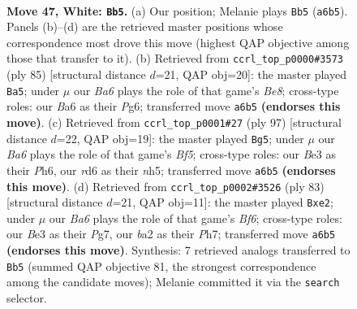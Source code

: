 \documentclass[11pt]{article}
\begin{document}
\clearpage

\begin{figure}[p]\centering
\begin{subfigure}{0.46\textwidth}\centering
\resizebox{\linewidth}{!}{%
\newchessgame
\chessboard[
  setfen={7k/4R3/B2r4/8/4p2p/4Bp1P/b4P2/6K1 w - - 4 47},
  showmover=false,
  pgfstyle=straightmove, color=movearrow, markmove={a6-b5}
]}
\caption{}
\end{subfigure}\hfill
\begin{subfigure}{0.46\textwidth}\centering
\resizebox{\linewidth}{!}{%
\newchessgame
\chessboard[
  setfen={7k/7p/4R1p1/6p1/P1K5/5B1P/1r4P1/4b3 b - - 3 43},
  showmover=false,
  pgfstyle=straightmove, color=movearrow, markmove={e1-a5}
]}
\caption{}
\end{subfigure}
\\[4pt]
\begin{subfigure}{0.46\textwidth}\centering
\resizebox{\linewidth}{!}{%
\newchessgame
\chessboard[
  setfen={6k1/5p2/7p/7N/Pp3b2/1P1r4/5PK1/4R3 b - - 2 49},
  showmover=false,
  pgfstyle=straightmove, color=movearrow, markmove={f4-g5}
]}
\caption{}
\end{subfigure}\hfill
\begin{subfigure}{0.46\textwidth}\centering
\resizebox{\linewidth}{!}{%
\newchessgame
\chessboard[
  setfen={8/4kppp/8/KP4P1/2r4P/3R1b2/4N3/8 b - - 26 42},
  showmover=false,
  pgfstyle=straightmove, color=movearrow, markmove={f3-e2}
]}
\caption{}
\end{subfigure}
\caption{\textbf{Move 47, White: \texttt{Bb5}.} (a) Our position; Melanie plays \texttt{Bb5} (\texttt{a6b5}). Panels (b)--(d) are the retrieved master positions whose correspondence most drove this move (highest QAP objective among those that transfer to it). (b) Retrieved from \texttt{ccrl\_top\_p0000\#3573} (ply 85) [structural distance $d$=21, QAP obj=20]: the master played \texttt{Ba5}; under $\mu$ our \emph{Ba6} plays the role of that game's \emph{Be8}; cross-type roles: our \emph{B}a6 as their \emph{P}g6; transferred move \texttt{a6b5} \textbf{(endorses this move)}. (c) Retrieved from \texttt{ccrl\_top\_p0001\#27} (ply 97) [structural distance $d$=22, QAP obj=19]: the master played \texttt{Bg5}; under $\mu$ our \emph{Ba6} plays the role of that game's \emph{Bf5}; cross-type roles: our \emph{B}e3 as their \emph{P}h6, our \emph{r}d6 as their \emph{n}h5; transferred move \texttt{a6b5} \textbf{(endorses this move)}. (d) Retrieved from \texttt{ccrl\_top\_p0002\#3526} (ply 83) [structural distance $d$=21, QAP obj=11]: the master played \texttt{Bxe2}; under $\mu$ our \emph{Ba6} plays the role of that game's \emph{Bf6}; cross-type roles: our \emph{B}e3 as their \emph{P}g7, our \emph{b}a2 as their \emph{P}h7; transferred move \texttt{a6b5} \textbf{(endorses this move)}. Synthesis: 7 retrieved analogs transferred to \texttt{Bb5} (summed QAP objective 81, the strongest correspondence among the candidate moves); Melanie committed it via the \texttt{search} selector.}
\label{fig:thought-m92}
\end{figure}
\end{document}
